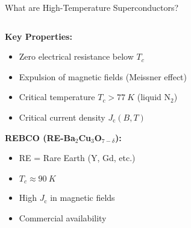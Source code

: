 \documentclass[aspectratio=169,xcolor={table,dvipsnames}]{beamer}
\newcommand{\Kelvin}[1]{#1~K}
\newcommand{\Jc}{J_\text{c}}
\begin{document}
\begin{frame}{What are High-Temperature Superconductors?}
    \begin{columns}
        \begin{column}{0.6\textwidth}
            \textbf{Key Properties:}
            \begin{itemize}
                \item Zero electrical resistance below $T_c$
                \item Expulsion of magnetic fields (Meissner effect)
                \item Critical temperature $T_c > \Kelvin{77}$ (liquid N$_2$)
                \item Critical current density $\Jc(B,T)$
            \end{itemize}
            
            \vspace{0.5cm}
            \textbf{REBCO (RE-Ba$_2$Cu$_3$O$_{7-\delta}$):}
            \begin{itemize}
                \item RE = Rare Earth (Y, Gd, etc.)
                \item $T_c \approx \Kelvin{90}$
                \item High $\Jc$ in magnetic fields
                \item Commercial availability
            \end{itemize}
        \end{column}
        \begin{column}{0.4\textwidth}
            \centering
        \end{column}
    \end{columns}
\end{frame}
\end{document}

